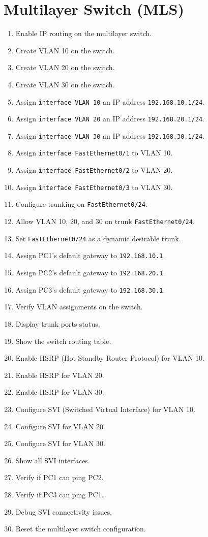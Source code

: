 \documentclass[a4paper]{book}
\begin{document}
\newpage

\chapter{Multilayer Switch (MLS)}

\begin{enumerate}
    \item Enable IP routing on the multilayer switch.
    \item Create VLAN 10 on the switch.
    \item Create VLAN 20 on the switch.
    \item Create VLAN 30 on the switch.
    \item Assign \texttt{interface VLAN 10} an IP address \texttt{192.168.10.1/24}.
    \item Assign \texttt{interface VLAN 20} an IP address \texttt{192.168.20.1/24}.
    \item Assign \texttt{interface VLAN 30} an IP address \texttt{192.168.30.1/24}.
    \item Assign \texttt{interface FastEthernet0/1} to VLAN 10.
    \item Assign \texttt{interface FastEthernet0/2} to VLAN 20.
    \item Assign \texttt{interface FastEthernet0/3} to VLAN 30.
    \item Configure trunking on \texttt{FastEthernet0/24}.
    \item Allow VLAN 10, 20, and 30 on trunk \texttt{FastEthernet0/24}.
    \item Set \texttt{FastEthernet0/24} as a dynamic desirable trunk.
    \item Assign PC1's default gateway to \texttt{192.168.10.1}.
    \item Assign PC2's default gateway to \texttt{192.168.20.1}.
    \item Assign PC3's default gateway to \texttt{192.168.30.1}.
    \item Verify VLAN assignments on the switch.
    \item Display trunk ports status.
    \item Show the switch routing table.
    \item Enable HSRP (Hot Standby Router Protocol) for VLAN 10.
    \item Enable HSRP for VLAN 20.
    \item Enable HSRP for VLAN 30.
    \item Configure SVI (Switched Virtual Interface) for VLAN 10.
    \item Configure SVI for VLAN 20.
    \item Configure SVI for VLAN 30.
    \item Show all SVI interfaces.
    \item Verify if PC1 can ping PC2.
    \item Verify if PC3 can ping PC1.
    \item Debug SVI connectivity issues.
    \item Reset the multilayer switch configuration.
\end{enumerate}
\end{document}
